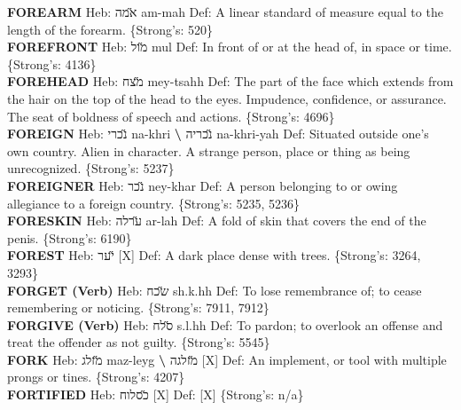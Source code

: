 {\textbf{FOREARM} Heb: {\large\H אמה} am-mah Def: A linear standard of measure equal to the length of the forearm. \{Strong's: 520\}\hfill{}\\

\textbf{FOREFRONT} Heb: {\large\H מול} mul Def: In front of or at the head of, in space or time. \{Strong's: 4136\}\hfill{}\\

\textbf{FOREHEAD} Heb: {\large\H מצח} mey-tsahh Def: The part of the face which extends from the hair on the top of the head to the eyes. Impudence, confidence, or assurance. The seat of boldness of speech and actions. \{Strong's: 4696\}\hfill{}\\

\textbf{FOREIGN} Heb: {\large\H נכרי} na-khri \textbf{\textbackslash{}} {\large\H נכריה} na-khri-yah Def: Situated outside one's own country. Alien in character. A strange person, place or thing as being unrecognized. \{Strong's: 5237\}\hfill{}\\

\textbf{FOREIGNER} Heb: {\large\H נכר} ney-khar Def: A person belonging to or owing allegiance to a foreign country. \{Strong's: 5235, 5236\}\hfill{}\\

\textbf{FORESKIN} Heb: {\large\H ערלה} ar-lah Def: A fold of skin that covers the end of the penis. \{Strong's: 6190\}\hfill{}\\

\textbf{FOREST} Heb: {\large\H יער} {[}X{]} Def: A dark place dense with trees. \{Strong's: 3264, 3293\}\hfill{}\\

\textbf{FORGET (Verb)} Heb: {\large\H שכח} sh.k.hh Def: To lose remembrance of; to cease remembering or noticing. \{Strong's: 7911, 7912\}\hfill{}\\

\textbf{FORGIVE (Verb)} Heb: {\large\H סלח} s.l.hh Def: To pardon; to overlook an offense and treat the offender as not guilty. \{Strong's: 5545\}\hfill{}\\

\textbf{FORK} Heb: {\large\H מזלג} maz-leyg \textbf{\textbackslash{}} {\large\H מזלגה} {[}X{]} Def: An implement, or tool with multiple prongs or tines. \{Strong's: 4207\}\hfill{}\\

\textbf{FORTIFIED} Heb: {\large\H כסלוח} {[}X{]} Def: {[}X{]} \{Strong's: n/a\}\hfill{}\\

}

